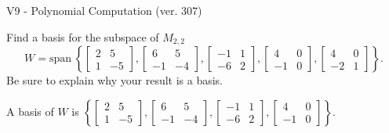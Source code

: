 \begin{exercise}
  \begin{exerciseTitle}V9 - Polynomial Computation (ver. 307)\end{exerciseTitle}
  \begin{exerciseStatement}
    Find a basis for the subspace of \(M_{2,2}\) 
\[W=\mathrm{span}\ \left\{\left[\begin{array}{cc}
2 & 5 \\
1 & -5
\end{array}\right] , \left[\begin{array}{cc}
6 & 5 \\
-1 & -4
\end{array}\right] , \left[\begin{array}{cc}
-1 & 1 \\
-6 & 2
\end{array}\right] , \left[\begin{array}{cc}
4 & 0 \\
-1 & 0
\end{array}\right] , \left[\begin{array}{cc}
4 & 0 \\
-2 & 1
\end{array}\right]\right\}.\]
 Be sure to explain why your result is a basis.


  \end{exerciseStatement}
  \begin{exerciseAnswer}
   A basis of \(W\) is  \(\left\{\left[\begin{array}{cc}
2 & 5 \\
1 & -5
\end{array}\right] , \left[\begin{array}{cc}
6 & 5 \\
-1 & -4
\end{array}\right] , \left[\begin{array}{cc}
-1 & 1 \\
-6 & 2
\end{array}\right] , \left[\begin{array}{cc}
4 & 0 \\
-1 & 0
\end{array}\right]\right\}\).
  


  \end{exerciseAnswer}
\end{exercise}